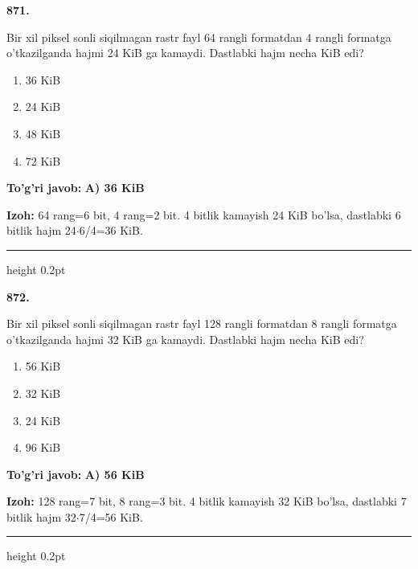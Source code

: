 \documentclass[10pt,a4paper,oneside]{article}
\begin{document}
\noindent\textbf{\color{ink}871.}
\par
Bir xil piksel sonli siqilmagan rastr fayl 64 rangli formatdan 4 rangli formatga o'tkazilganda hajmi 24 KiB ga kamaydi. Dastlabki hajm necha KiB edi?
\begin{enumerate}[label=\Alph*),leftmargin=9mm]
\item 36 KiB
\item 24 KiB
\item 48 KiB
\item 72 KiB
\end{enumerate}
\begin{tcolorbox}[enhanced,breakable,colback=teal!4,colframe=teal!50!black,boxrule=0.5pt,arc=1.1mm,left=3mm,right=3mm,top=1.7mm,bottom=1.7mm,before skip=2mm,after skip=2mm]
\textbf{\color{teal}To'g'ri javob:} \textbf{A) 36 KiB}
\par\smallskip
\textbf{Izoh:} 64 rang=6 bit, 4 rang=2 bit. 4 bitlik kamayish 24 KiB bo'lsa, dastlabki 6 bitlik hajm 24\ensuremath{\cdot}6/4=36 KiB.
\end{tcolorbox}
\vspace{2mm}\hrule height 0.2pt \vspace{3mm}

\noindent\textbf{\color{ink}872.}
\par
Bir xil piksel sonli siqilmagan rastr fayl 128 rangli formatdan 8 rangli formatga o'tkazilganda hajmi 32 KiB ga kamaydi. Dastlabki hajm necha KiB edi?
\begin{enumerate}[label=\Alph*),leftmargin=9mm]
\item 56 KiB
\item 32 KiB
\item 24 KiB
\item 96 KiB
\end{enumerate}
\begin{tcolorbox}[enhanced,breakable,colback=teal!4,colframe=teal!50!black,boxrule=0.5pt,arc=1.1mm,left=3mm,right=3mm,top=1.7mm,bottom=1.7mm,before skip=2mm,after skip=2mm]
\textbf{\color{teal}To'g'ri javob:} \textbf{A) 56 KiB}
\par\smallskip
\textbf{Izoh:} 128 rang=7 bit, 8 rang=3 bit. 4 bitlik kamayish 32 KiB bo'lsa, dastlabki 7 bitlik hajm 32\ensuremath{\cdot}7/4=56 KiB.
\end{tcolorbox}
\vspace{2mm}\hrule height 0.2pt \vspace{3mm}
\end{document}
